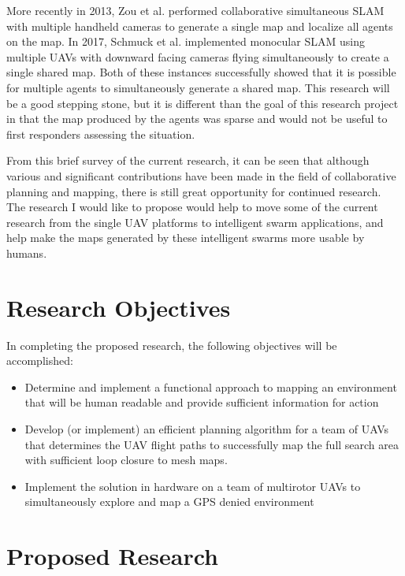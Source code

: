 \documentclass[12pt, letterpaper]{article}
\begin{document}
More recently in 2013, Zou et al. \cite{Zou2013} performed collaborative simultaneous SLAM with multiple handheld cameras to generate a single map and localize all agents on the map. In 2017, Schmuck et al. \cite{Schmuck2017} implemented monocular SLAM using multiple UAVs with downward facing cameras flying simultaneously to create a single shared map. Both of these instances successfully showed that it is possible for multiple agents to simultaneously generate a shared map. This research will be a good stepping stone, but it is different than the goal of this research project in that the map produced by the agents was sparse and would not be useful to first responders assessing the situation. 

From this brief survey of the current research, it can be seen that although various and significant contributions have been made in the field of collaborative planning and mapping, there is still great opportunity for continued research.  The research I would like to propose would help to move some of the current research from the single UAV platforms to intelligent swarm applications, and help make the maps generated by these intelligent swarms more usable by humans.

\section{Research Objectives}

In completing the proposed research, the following objectives will be accomplished:


\begin{itemize}
	
	\item Determine and implement a functional approach to mapping an environment that will be human readable and provide sufficient information for action

	\item Develop (or implement) an efficient planning algorithm for a team of UAVs that determines the UAV flight paths to successfully map the full search area with sufficient loop closure to mesh maps. 

	\item Implement the solution in hardware on a team of multirotor UAVs to simultaneously explore and map a GPS denied environment


\end{itemize}

\section{Proposed Research}
\end{document}
